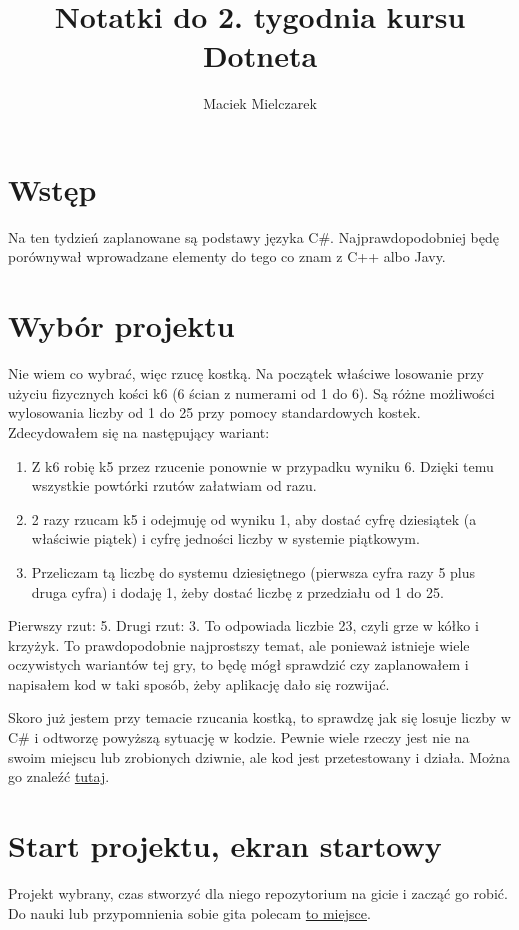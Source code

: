 \documentclass[10pt]{article}
\title{Notatki do 2. tygodnia kursu Dotneta}
\author{Maciek Mielczarek}
\begin{document}
\maketitle

\tableofcontents

\section{Wstęp}
Na ten tydzień zaplanowane są podstawy języka C\#. Najprawdopodobniej będę porównywał wprowadzane elementy do tego co znam z C++ albo Javy.

\section{Wybór projektu}
Nie wiem co wybrać, więc rzucę kostką. Na początek właściwe losowanie przy użyciu fizycznych kości k6 (6 ścian z numerami od 1 do 6). Są różne możliwości wylosowania liczby od 1 do 25 przy pomocy standardowych kostek. Zdecydowałem się na następujący wariant:
\begin{enumerate}
\item Z k6 robię k5 przez rzucenie ponownie w przypadku wyniku 6. Dzięki temu wszystkie powtórki rzutów załatwiam od razu.
\item 2 razy rzucam k5 i odejmuję od wyniku 1, aby dostać cyfrę dziesiątek (a właściwie piątek) i cyfrę jedności liczby w systemie piątkowym.
\item Przeliczam tą liczbę do systemu dziesiętnego (pierwsza cyfra razy 5 plus druga cyfra) i dodaję 1, żeby dostać liczbę z przedziału od 1 do 25.
\end{enumerate}

Pierwszy rzut: 5. Drugi rzut: 3. To odpowiada liczbie 23, czyli grze w kółko i krzyżyk. To prawdopodobnie najprostszy temat, ale ponieważ istnieje wiele oczywistych wariantów tej gry, to będę mógł sprawdzić czy zaplanowałem i napisałem kod w taki sposób, żeby aplikację dało się rozwijać.

Skoro już jestem przy temacie rzucania kostką, to sprawdzę jak się losuje liczby w C\# i odtworzę powyższą sytuację w kodzie. Pewnie wiele rzeczy jest nie na swoim miejscu lub zrobionych dziwnie, ale kod jest przetestowany i działa. Można go znaleźć \href{https://github.com/maciej-marek-mielczarek/kurs-dotneta/tree/master/tydzien\_02/Dices}{tutaj}.

\section{Start projektu, ekran startowy}
Projekt wybrany, czas stworzyć dla niego repozytorium na gicie i zacząć go robić. Do nauki lub przypomnienia sobie gita polecam \href{https://learngitbranching.js.org/}{to miejsce}.
\end{document}
